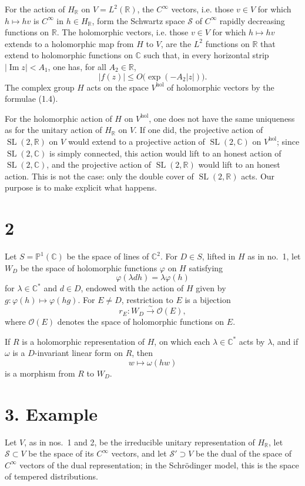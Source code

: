 \documentclass[11pt]{article}
\newcommand{\C}{\mathbb C}
\newcommand{\R}{\mathbb R}
\newcommand{\cO}{\mathcal O}
\newcommand{\hol}{\mathrm{hol}}
\DeclareMathOperator{\SL}{SL}
\begin{document}
For the action of $H_\R$ on $V=L^2(\R)$, the $C^\infty$ vectors, i.e. those $v\in V$ for which $h\mapsto hv$ is $C^\infty$ in $h\in H_\R$, form the Schwartz space $\mathscr S$ of $C^\infty$ rapidly decreasing functions on $\R$. The holomorphic vectors, i.e. those $v\in V$ for which $h\mapsto hv$ extends to a holomorphic map from $H$ to $V$, are the $L^2$ functions on $\R$ that extend to holomorphic functions on $\C$ such that, in every horizontal strip $|\operatorname{Im}z|<A_1$, one has, for all $A_2\in\R$,
\[
|f(z)|\le O\bigl(\exp(-A_2|z|)\bigr).
\]
The complex group $H$ acts on the space $V^{\hol}$ of holomorphic vectors by the formulae (1.4).

For the holomorphic action of $H$ on $V^{\hol}$, one does not have the same uniqueness as for the unitary action of $H_\R$ on $V$. If one did, the projective action of $\SL(2,\R)$ on $V$ would extend to a projective action of $\SL(2,\C)$ on $V^{\hol}$; since $\SL(2,\C)$ is simply connected, this action would lift to an honest action of $\SL(2,\C)$, and the projective action of $\SL(2,\R)$ would lift to an honest action. This is not the case: only the double cover of $\SL(2,\R)$ acts. Our purpose is to make explicit what happens.

\section*{2}
Let $S=\mathbb P^1(\C)$ be the space of lines of $\C^2$. For $D\in S$, lifted in $H$ as in no.~1, let $W_D$ be the space of holomorphic functions $\varphi$ on $H$ satisfying
\[
\varphi(\lambda d h)=\lambda\varphi(h)
\]
for $\lambda\in\C^*$ and $d\in D$, endowed with the action of $H$ given by $g:\varphi(h)\mapsto\varphi(hg)$. For $E\ne D$, restriction to $E$ is a bijection
\begin{equation}\tag{2.1}
r_E:W_D\xrightarrow{\sim}\cO(E),
\end{equation}
where $\cO(E)$ denotes the space of holomorphic functions on $E$.

If $R$ is a holomorphic representation of $H$, on which each $\lambda\in\C^*$ acts by $\lambda$, and if $\omega$ is a $D$-invariant linear form on $R$, then
\begin{equation}\tag{2.2}
w\longmapsto \omega(hw)
\end{equation}
is a morphism from $R$ to $W_D$.

\section*{3. Example}
Let $V$, as in nos.~1 and 2, be the irreducible unitary representation of $H_\R$, let $\mathscr S\subset V$ be the space of its $C^\infty$ vectors, and let $\mathscr S'\supset V$ be the dual of the space of $C^\infty$ vectors of the dual representation; in the Schr\"odinger model, this is the space of tempered distributions.
\end{document}
